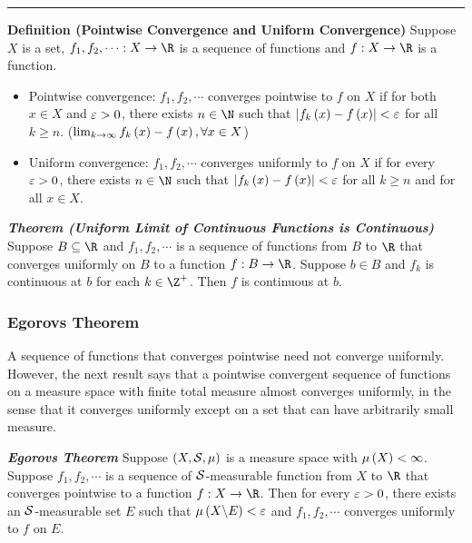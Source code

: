 \documentclass[
]{article}
\begin{document}
\begin{center}\rule{0.5\linewidth}{0.5pt}\end{center}

\textbf{Definition (Pointwise Convergence and Uniform Convergence)}
Suppose \(X\) is a set, \(f_1,f_2,\cdots: X\to \R\) is a sequence of
functions and \(f:X\to \R\) is a function.

\begin{itemize}
\item
  Pointwise convergence: \(f_1,f_2,\cdots\) converges pointwise to \(f\)
  on \(X\) if for both \(x\in X\) and \(\ve>0\), there exists
  \(n\in \N\) such that \(\abs{f_k\pr{x}-f\pr{x}}<\ve\) for all
  \(k\ge n\). (\(\lim_{k\to\infty} f_k\pr{x} - f\pr{x},\forall x\in X\))
\item
  Uniform convergence: \(f_1,f_2,\cdots\) converges uniformly to \(f\)
  on \(X\) if for every \(\ve>0\), there exists \(n\in \N\) such that
  \(\abs{f_k\pr{x}-f\pr{x}}<\ve\) for all \(k\ge n\) and for all
  \(x\in X\).
\end{itemize}

\emph{\textbf{Theorem (Uniform Limit of Continuous Functions is
Continuous)}} Suppose \(B\se \R\) and \(f_1,f_2,\cdots\) is a sequence
of functions from \(B\) to \(\R\) that converges uniformly on \(B\) to a
function \(f:B\to \R\). Suppose \(b\in B\) and \(f_k\) is continuous at
\(b\) for each \(k\in \Z^+\). Then \(f\) is continuous at \(b\).

\hypertarget{egorovs-theorem}{%
\subsubsection{Egorov\textquotesingle s Theorem}\label{egorovs-theorem}}

A sequence of functions that converges pointwise need not converge
uniformly. However, the next result says that a pointwise convergent
sequence of functions on a measure space with finite total measure
almost converges uniformly, in the sense that it converges uniformly
except on a set that can have arbitrarily small measure.

\emph{\textbf{Egorov\textquotesingle s Theorem}} Suppose
\(\pr{X,\S,\mu}\) is a measure space with \(\mu\pr{X}<\infty\). Suppose
\(f_1,f_2,\cdots\) is a sequence of \(\S\)-measurable function from
\(X\) to \(\R\) that converges pointwise to a function \(f:X\to \R\).
Then for every \(\ve>0\), there exists an \(\S\)-measurable set \(E\)
such that \(\mu\pr{X\c E}<\ve\) and \(f_1,f_2,\cdots\) converges
uniformly to \(f\) on \(E\).
\end{document}
